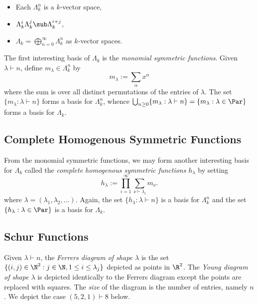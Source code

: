 \documentclass[12pt]{article}
\begin{document}
\begin{itemize}
  \item Each $ \Lambda_{k}^{n} $ is a $ k $-vector space,
  \item $ \Lambda_{k}^{i} \Lambda_{k}^{j}\sub \Lambda_{k}^{i+j} $,
  \item $ \Lambda_{k}=\bigoplus_{n=0}^{\infty} \Lambda_{k}^{n} $ as $ k $-vector spaces.
\end{itemize}
The first interesting basis of $ \Lambda_{k} $ is the \textit{monomial symmetric functions}. Given $ \lambda\vdash n $, define $ m_{\lambda}\in \Lambda_{k}^{n} $ by 
\[
  m_{\lambda}:= \sum_{\alpha} x^{\alpha}
\]
where the sum is over all distinct permutations of the entries of $ \lambda $. The set $ \{m_{\lambda}: \lambda\vdash n\} $ forms a basis for $ \Lambda_{k}^{n} $, whence $\bigcup_{n\geq0} \{m_{\lambda}: \lambda\vdash n\} = \{m_{\lambda}: \lambda\in\Par\} $ forms a basis for $ \Lambda_{k} $.

\subsection{Complete Homogenous Symmetric Functions}

From the monomial symmetric functions, we may form another interesting basis for $ \Lambda_{k} $ called the \textit{complete homogenous symmetric functions} $ h_{\lambda} $ by setting 
\[
  h_{\lambda}:=\prod_{i=1}^{\infty} \sum_{\nu\vdash \lambda_{i}} m_{\nu}.
\]
where $ \lambda = (\lambda_{1},\lambda_{2},\ldots) $. Again, the set $ \{h_{\lambda}: \lambda\vdash n\} $ is a basis for $ \Lambda_{k}^{n} $ and the set $ \{h_{\lambda}: \lambda\in\Par\} $ is a basis for $ \Lambda_{k} $.
\subsection{Schur Functions}

\begin{definition}\label{def:youngdiagram}
  Given $ \lambda\vdash n $, the \textit{Ferrers diagram of shape $ \lambda $} is the set $\{(i,j)\in \N^{2} : j\in \N, 1\leq i \leq \lambda_{j}\}$ depicted as points in $ \R^{2} $. The \textit{Young diagram of shape $ \lambda $} is depicted identically to the Ferrers diagram except the points are replaced with squares. The \textit{size} of the diagram is the number of entries, namely $ n $. We depict the case $ (5,2,1)\vdash 8 $ below.
\end{definition}
\end{document}
